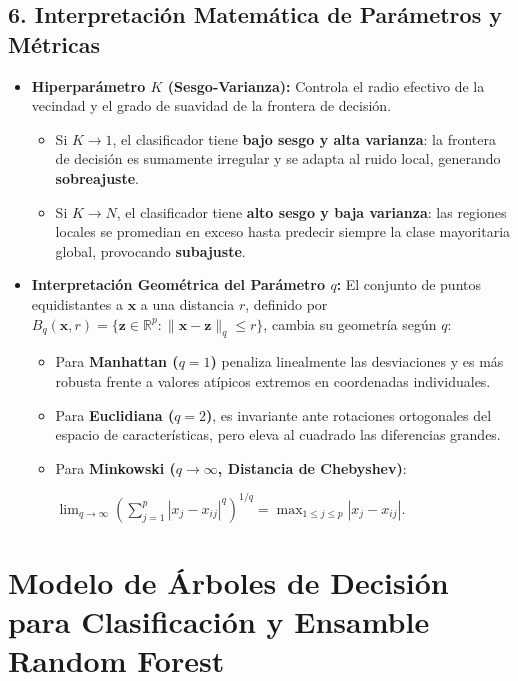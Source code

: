 \documentclass[11pt, a4paper]{article}
\begin{document}
\subsection*{6. Interpretación Matemática de Parámetros y Métricas}
\begin{itemize}
    \item \textbf{Hiperparámetro $K$ (Sesgo-Varianza):} Controla el radio efectivo de la vecindad y el grado de suavidad de la frontera de decisión.
    \begin{itemize}
        \item Si $K \to 1$, el clasificador tiene \textbf{bajo sesgo y alta varianza}: la frontera de decisión es sumamente irregular y se adapta al ruido local, generando \textbf{sobreajuste}.
        \item Si $K \to N$, el clasificador tiene \textbf{alto sesgo y baja varianza}: las regiones locales se promedian en exceso hasta predecir siempre la clase mayoritaria global, provocando \textbf{subajuste}.
    \end{itemize}
    \item \textbf{Interpretación Geométrica del Parámetro $q$:} El conjunto de puntos equidistantes a $\mathbf{x}$ a una distancia $r$, definido por $B_q(\mathbf{x}, r) = \{\mathbf{z} \in \mathbb{R}^p : \|\mathbf{x} - \mathbf{z}\|_q \le r\}$, cambia su geometría según $q$:
    \begin{itemize}
        \item Para \textbf{Manhattan ($q=1$)} penaliza linealmente las desviaciones y es más robusta frente a valores atípicos extremos en coordenadas individuales.
        \item Para \textbf{Euclidiana ($q=2$)}, es invariante ante rotaciones ortogonales del espacio de características, pero eleva al cuadrado las diferencias grandes.
        \item Para \textbf{Minkowski ($q \to \infty$, Distancia de Chebyshev)}: 
        
        $\lim_{q \to \infty} \left(\sum_{j=1}^p |x_j - x_{ij}|^q\right)^{1/q} = \max_{1 \le j \le p} |x_j - x_{ij}|$.
    \end{itemize}
\end{itemize}
\vspace{0.4cm}

\section*{\textcolor{cugdlblue}{Modelo de Árboles de Decisión para Clasificación y Ensamble Random Forest}}
\end{document}
